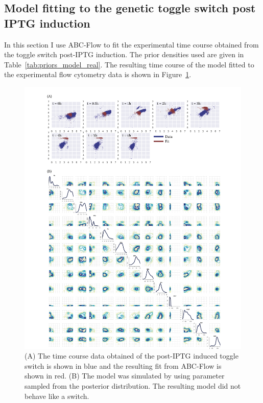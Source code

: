 \subsection{Model fitting to the genetic toggle switch post IPTG induction}
In this section I use ABC-Flow to fit the experimental time course obtained from the toggle switch post-IPTG induction. The prior densities used are given in Table~\ref{tab:priors_model_real}. The resulting time course of the model fitted to the experimental flow cytometry data is shown in Figure~\ref{fig:1d-real-res-iptg}. 


\begin{figure}[htbp]
\centerfloat%
	\includegraphics[width=1.2\textwidth]{../../chapters/chapterABCFlow/images/2D_real_res_IPTG.png}
	\caption[LoF caption]{\label{fig:1d-real-res-iptg} (A) The time course data obtained of the post-IPTG induced toggle switch is shown in blue and the resulting fit from ABC-Flow is shown in red. (B) The model was simulated by using parameter sampled from the posterior distribution. The resulting model did not behave like a switch. }
\end{figure}

